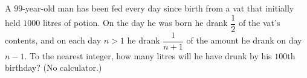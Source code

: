 A $99$-year-old man has been fed every day since birth from a vat that initially held $1000$ litres of potion. On the day he was born he drank $\dfrac12$ of the vat's contents, and on each day $n>1$ he drank $\dfrac1{n+1}$ of the amount he drank on day $n-1$. To the nearest integer, how many litres will he have drunk by his $100$th birthday? (No calculator.)
